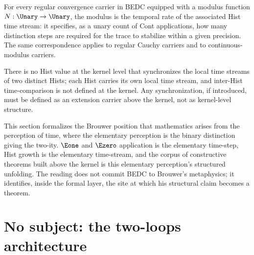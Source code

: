 \begin{theorem}
\label{thm:modulus-temporal-rate}
For every regular convergence carrier in BEDC equipped with a modulus function \(N : \Unary \to \Unary\), the modulus is the temporal rate of the associated Hist time stream: it specifies, as a unary count of Cont applications, how many distinction steps are required for the trace to stabilize within a given precision. The same correspondence applies to regular Cauchy carriers and to continuous-modulus carriers.
\end{theorem}
\begin{corollary}
\label{cor:no-global-clock}
There is no Hist value at the kernel level that synchronizes the local time streams of two distinct Hists; each Hist carries its own local time stream, and inter-Hist time-comparison is not defined at the kernel. Any synchronization, if introduced, must be defined as an extension carrier above the kernel, not as kernel-level structure.
\end{corollary}
\begin{remark}[Reading]
\label{rem:brouwer-time}
This section formalizes the Brouwer position that mathematics arises from the perception of time, where the elementary perception is the binary distinction giving the two-ity. \(\Eone\) and \(\Ezero\) application is the elementary time-step, Hist growth is the elementary time-stream, and the corpus of constructive theorems built above the kernel is this elementary perception's structured unfolding. The reading does not commit BEDC to Brouwer's metaphysics; it identifies, inside the formal layer, the site at which his structural claim becomes a theorem.
\end{remark}

\section{No subject: the two-loops architecture}
\label{sec:observer-two-loops-no-subject}

